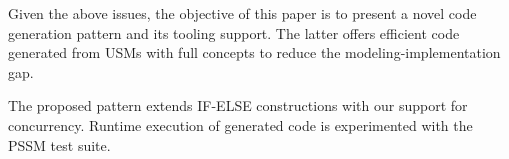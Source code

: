 Given the above issues, the objective of this paper is to present a novel code generation pattern and its tooling support. 
The latter offers efficient code generated from USMs with full concepts to reduce the modeling-implementation gap.   

The proposed pattern extends IF-ELSE constructions with our support for concurrency. 
Runtime execution of generated code is experimented with the PSSM test suite.
  


